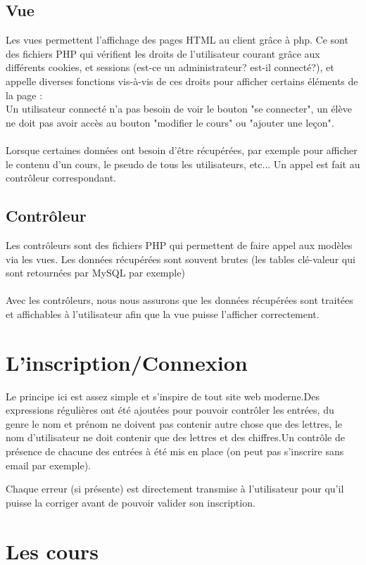 \documentclass[a4paper,11pt]{article}
\begin{document}
\subsection{Vue}
Les vues permettent l'affichage des pages HTML au client grâce à php. Ce sont des fichiers PHP qui vérifient les droits de l'utilisateur courant grâce aux différents cookies, et sessions (est-ce un administrateur? est-il connecté?), et appelle diverses fonctions vis-à-vis de ces droits pour afficher certains éléments de la page : \\
Un utilisateur connecté n'a pas besoin de voir le bouton "se connecter", un élève ne doit pas avoir accès au bouton "modifier le cours" ou "ajouter une leçon".\\ \\
Lorsque certaines données ont besoin d'être récupérées, par exemple pour afficher le contenu d'un cours, le pseudo de tous les utilisateurs, etc... Un appel est fait au contrôleur correspondant.
\subsection{Contrôleur}
Les contrôleurs sont des fichiers PHP qui permettent de faire appel aux modèles via les vues. Les données récupérées sont souvent brutes (les tables clé-valeur qui sont retournées par MySQL par exemple)\\\\
Avec les contrôleurs, nous nous assurons que les données récupérées sont traitées et affichables à l'utilisateur afin que la vue puisse l'afficher correctement.

\newpage
\section{L'inscription/Connexion}
Le principe ici est assez simple et s'inspire de tout site web moderne.Des expressions régulières ont été ajoutées pour pouvoir contrôler les entrées, du genre le nom et prénom ne doivent pas contenir autre chose que des lettres, le nom d'utilisateur ne doit contenir que des lettres et des chiffres.Un contrôle de présence de chacune des entrées à été mis en place (on peut pas s'inscrire sans email par exemple).

Chaque erreur (si présente) est directement transmise à l'utilisateur pour qu'il puisse la corriger avant de pouvoir valider son inscription.

\section{Les cours}
\end{document}
